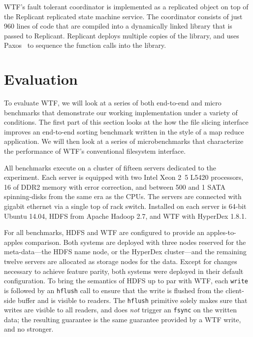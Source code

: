 \documentclass[twocolumn,10pt,letterpaper]{article}
\newcommand{\code}[1]{\texttt{#1}}
\begin{document}
WTF's fault tolerant coordinator is implemented as a replicated object on top of
the Replicant replicated state machine service.  The coordinator consists of
just 960 lines of code that are compiled into a dynamically linked library that
is passed to Replicant.  Replicant deploys multiple copies of the library, and
uses Paxos~\cite{paxos} to sequence the function calls into the library.

\section{Evaluation}
\label{sec:eval}

To evaluate WTF, we will look at a series of both end-to-end and micro
benchmarks that demonstrate our working implementation under a variety of
conditions.  The first part of this section looks at the how the file slicing
interface improves an end-to-end sorting benchmark written in the style of a map
reduce application.  We will then look at a series of microbenchmarks that
characterize the performance of WTF's conventional filesystem interface.

All benchmarks execute on a cluster of fifteen servers dedicated to the
experiment.  Each server is equipped with two Intel Xeon \unit{2.5}{\giga\hertz}
L5420 processors, \unit{16}{\giga\byte} of DDR2 memory with error correction,
and between \unit{500}{\giga\byte} and \unit{1}{\tera\byte} SATA spinning-disks
from the same era as the CPUs.  The servers are connected with gigabit ethernet
via a single top of rack switch.  Installed on each server is 64-bit Ubuntu
14.04, HDFS from Apache Hadoop 2.7, and WTF with HyperDex 1.8.1.

For all benchmarks, HDFS and WTF are configured to provide an apples-to-apples
comparison.  Both systems are deployed with three nodes reserved for the
meta-data---the HDFS name node, or the HyperDex cluster---and the remaining
twelve servers are allocated as storage nodes for the data.  Except for changes
necessary to achieve feature parity, both systems were deployed in their default
configuration.  To bring the semantics of HDFS up to par with WTF, each
\code{write} is followed by an \code{hflush} call to ensure that the write is
flushed from the client-side buffer and is visible to readers.  The
\code{hflush} primitive solely makes sure that writes are visible to all
readers, and does {\em not} trigger an \code{fsync} on the written data; the
resulting guarantee is the same guarantee provided by a WTF write, and no
stronger.
\end{document}

